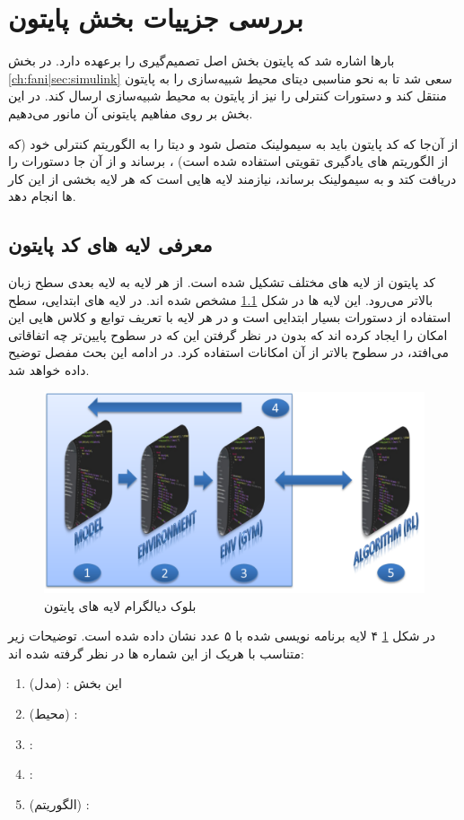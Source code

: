 \section{بررسی جزییات بخش پایتون}\label{ch:fani|sec:python}
بارها اشاره شد که پایتون بخش اصل تصمیم‌گیری را برعهده دارد. در بخش 
\ref{ch:fani|sec:simulink}
سعی شد تا به نحو مناسبی دیتای محیط شبیه‌سازی را به پایتون منتقل کند و دستورات کنترلی را نیز از پایتون به محیط شبیه‌سازی ارسال کند. در این بخش بر روی مفاهیم پایتونی آن مانور می‌دهیم.

از آن‌جا که کد پایتون باید به سیمولینک متصل شود و دیتا را به الگوریتم کنترلی خود (که از الگوریتم های یادگیری تقویتی استفاده شده است) ، برساند و از آن جا دستورات را دریافت کتد و به سیمولینک برساند، نیازمند لایه هایی است که هر لایه بخشی از این کار ها انجام دهد.

\subsection{معرفی لایه های کد پایتون}\label{ch:fani|sec:python|sub:layers}
کد پایتون از لایه های مختلف تشکیل شده است. از هر لایه به لایه بعدی سطح زبان بالاتر می‌رود. این لایه ها در شکل 
\ref{ch:fani|sec:python|sub:layers}
مشخص شده اند. در لایه های ابتدایی، سطح استفاده از دستورات بسیار ابتدایی است و در هر لایه با تعریف توابع و کلاس هایی این امکان را ایجاد کرده اند که بدون در نظر گرفتن این که در سطوح پایین‌تر چه اتفاقاتی می‌افتد، در سطوح بالاتر از آن امکانات استفاده کرد. در ادامه این بحث مفصل توضیح داده خواهد شد.



\begin{figure}
	\centering
	\includegraphics[width=0.7\linewidth]{Figures/python-layers-white}
	\caption{بلوک دیالگرام لایه های پایتون}
	\label{fig:python-layers}
\end{figure}
در شکل 
\ref{fig:python-layers}
۴ لایه برنامه نویسی شده با ۵ عدد نشان داده شده است. توضیحات زیر متناسب با هر‌یک از این شماره ها در نظر گرفته شده اند:

\begin{enumerate}
	\item \textbf{} (مدل) :
	این بخش 
	\item \textbf{} (محیط) :
	\item \textbf{} :
	\item \textbf{} :
	\item \textbf{} (الگوریتم) :
\end{enumerate}



